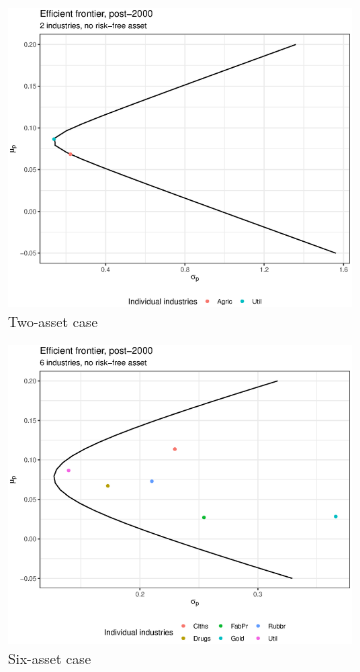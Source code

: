 \documentclass[11pt]{article}
\begin{document}
\begin{enumerate}
	\begin{figure}[!hbtp]
		\caption{Efficient Frontiers, Post-2000}
		\begin{subfigure}{.5\textwidth}
			\centering
			\includegraphics[width=.8\linewidth]{plot_7a.eps}
			\caption{Two-asset case}
			\label{fig3_a}
		\end{subfigure}%
		\begin{subfigure}{.5\textwidth}
			\centering
			\includegraphics[width=.8\linewidth]{plot_7b.eps}
			\caption{Six-asset case}
			\label{fig3_b}
		\end{subfigure}
		\begin{subfigure}{.5\textwidth}
			\centering

\end{subfigure}
\end{figure}
\end{enumerate}
\end{document}
